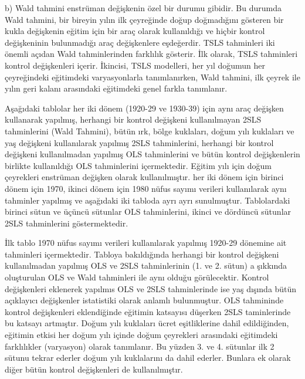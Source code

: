 \documentclass[a4paper]{article}
\begin{document}
\newpage 
b) Wald tahmini enstrüman değişkenin özel bir durumu gibidir.
Bu durumda Wald tahmini, bir bireyin yılın ilk çeyreğinde doğup doğmadığını gösteren bir kukla değişkenin eğitim için bir araç olarak kullanıldığı ve hiçbir kontrol değişkeninin bulunmadığı araç değişkenlere eşdeğerdir. TSLS tahminleri iki önemli açıdan Wald tahminlerinden farklılık gösterir. İlk olarak, TSLS tahminleri kontrol değişkenleri içerir. İkincisi, TSLS modelleri, her yıl doğumun her çeyreğindeki eğitimdeki varyasyonlarla tanımlanırken, Wald tahmini, ilk çeyrek ile yılın geri kalanı arasındaki eğitimdeki genel farkla tanımlanır.
\item
\item
Aşağıdaki tablolar her iki dönem (1920-29 ve 1930-39) için aynı araç değişken kullanarak yapılmış, herhangi bir kontrol değişkeni kullanılmayan 2SLS tahminlerini (Wald Tahmini), bütün ırk, bölge kuklaları, doğum yılı kuklaları ve yaş değişkeni kullanılarak yapılmış 2SLS tahminlerini, herhangi bir kontrol değişkeni kullanılmadan yapılmış OLS tahminlerini ve bütün kontrol değişkenlerin birlikte kullanıldığı OLS tahminlerini içermektedir.
Eğitim yılı için doğum çeyrekleri enstrüman değişken olarak kullanılmıştır. her iki dönem için birinci dönem için 1970, ikinci dönem için 1980 nüfus sayımı verileri kullanılarak aynı tahminler yapılmış ve aşağıdaki iki tabloda ayrı ayrı sunulmuştur. Tablolardaki birinci sütun ve üçüncü sütunlar OLS tahminlerini, ikinci ve dördüncü sütunlar 2SLS tahminlerini göstermektedir. 
\item
İlk tablo 1970 nüfus sayımı verileri kullanılarak yapılmış 1920-29 dönemine ait tahminleri içermektedir. Tabloya bakıldığında herhangi bir kontrol değişkeni kullanılmadan yapılmış OLS ve 2SLS tahminlerinin (1. ve 2. sütun) a şıkkında oluşturulan OLS ve Wald tahminleri ile aynı olduğu görülecektir. Kontrol değişkenleri eklenerek yapılmıs OLS ve 2SLS tahminlerinde ise yaş dışında bütün açıklayıcı değişkenler istatistiki olarak anlamlı bulunmuştur. OLS tahmininde kontrol değişkenleri eklendiğinde eğitimin katsayısı düşerken 2SLS taminlerinde bu katsayı artmıştır. Doğum yılı kuklaları ücret eşitliklerine dahil edildiğinden,  eğitimin etkisi her doğum yılı içinde doğum çeyrekleri arasındaki eğitimdeki farklılıkler (varyasyon) olarak tanımlanır. Bu yüzden 3. ve 4. sütunlar ilk 2 sütunu tekrar ederler doğum yılı kuklalarını da dahil ederler. Bunlara ek olarak diğer bütün kontrol değişkenleri de kullanılmıştır. 

\item
\end{document}
